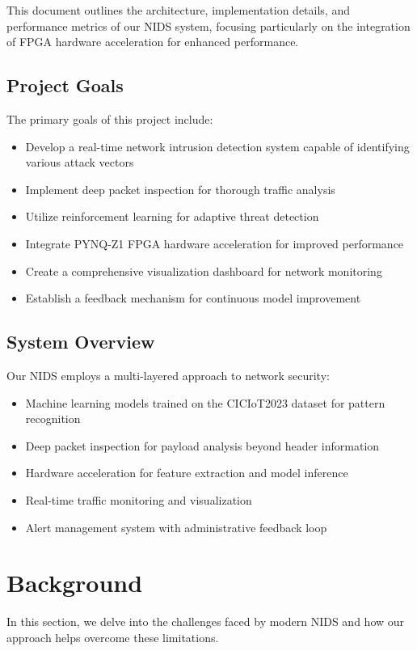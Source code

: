 \documentclass[12pt]{article}
\begin{document}
This document outlines the architecture, implementation details, and performance metrics of our NIDS system, focusing particularly on the integration of FPGA hardware acceleration for enhanced performance.

\subsection{Project Goals}
The primary goals of this project include:
\begin{itemize}
  \item Develop a real-time network intrusion detection system capable of identifying various attack vectors
  \item Implement deep packet inspection for thorough traffic analysis
  \item Utilize reinforcement learning for adaptive threat detection
  \item Integrate PYNQ-Z1 FPGA hardware acceleration for improved performance
  \item Create a comprehensive visualization dashboard for network monitoring
  \item Establish a feedback mechanism for continuous model improvement
\end{itemize}

\subsection{System Overview}
Our NIDS employs a multi-layered approach to network security:
\begin{itemize}
  \item Machine learning models trained on the CICIoT2023 dataset for pattern recognition
  \item Deep packet inspection for payload analysis beyond header information
  \item Hardware acceleration for feature extraction and model inference
  \item Real-time traffic monitoring and visualization
  \item Alert management system with administrative feedback loop
\end{itemize}

\section{Background}
In this section, we delve into the challenges faced by modern NIDS and how our approach helps overcome these limitations.
\end{document}

